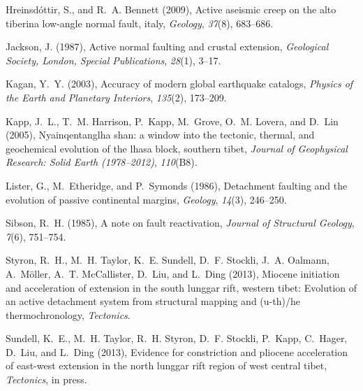 \documentclass[twocolumn,grl]{AGUTeX}
\begin{document}
\begin{article}
\begin{thebibliography}{25}
Hreinsd{\'o}ttir, S., and R.~A. Bennett (2009), Active aseismic creep on the
  alto tiberina low-angle normal fault, italy, \textit{Geology},
  \textit{37}(8), 683--686.

Jackson, J. (1987), Active normal faulting and crustal extension,
  \textit{Geological Society, London, Special Publications}, \textit{28}(1),
  3--17.

Kagan, Y.~Y. (2003), Accuracy of modern global earthquake catalogs,
  \textit{Physics of the Earth and Planetary Interiors}, \textit{135}(2),
  173--209.

Kapp, J.~L., T.~M. Harrison, P.~Kapp, M.~Grove, O.~M. Lovera, and D.~Lin
  (2005), Nyainqentanglha shan: a window into the tectonic, thermal, and
  geochemical evolution of the lhasa block, southern tibet, \textit{Journal of
  Geophysical Research: Solid Earth (1978--2012)}, \textit{110}(B8).

Lister, G., M.~Etheridge, and P.~Symonds (1986), Detachment faulting and the
  evolution of passive continental margins, \textit{Geology}, \textit{14}(3),
  246--250.

Sibson, R.~H. (1985), A note on fault reactivation, \textit{Journal of
  Structural Geology}, \textit{7}(6), 751--754.

Styron, R.~H., M.~H. Taylor, K.~E. Sundell, D.~F. Stockli, J.~A. Oalmann,
  A.~M{\"o}ller, A.~T. McCallister, D.~Liu, and L.~Ding (2013), Miocene
  initiation and acceleration of extension in the south lunggar rift, western
  tibet: Evolution of an active detachment system from structural mapping and
  (u-th)/he thermochronology, \textit{Tectonics}.

Sundell, K.~E., M.~H. Taylor, R.~H. Styron, D.~F. Stockli, P.~Kapp, C.~Hager,
  D.~Liu, and L.~Ding (2013), Evidence for constriction and pliocene
  acceleration of east-west extension in the north lunggar rift region of west
  central tibet, \textit{Tectonics}, in press.


\end{thebibliography}
\end{article}
\end{document}
